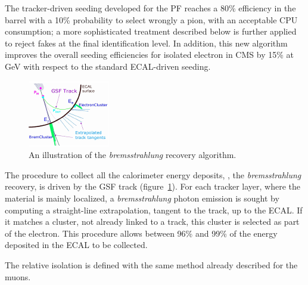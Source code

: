 The tracker-driven seeding developed for the PF reaches a 80\% efficiency in the barrel with a 10\% probability
to select wrongly a pion, with an acceptable CPU consumption; a more sophisticated treatment described below 
is further applied to reject fakes at the final identification level. 
In addition, this new algorithm improves the overall seeding efficiencies for isolated electron in CMS by 15\% at \unit[5]{GeV} with respect to the standard ECAL-driven seeding. 

\begin{figure}[htb]
    \centering
    \includegraphics[width=.5\textwidth]{images/pdf/electron_reconstruction}

    \caption{An illustration of the \emph{bremsstrahlung} recovery
algorithm.}
    \label{fig:electron_reconstruction}
\end{figure}

The procedure to collect all the calorimeter energy deposits, \ie, the \emph{bremsstrahlung} recovery, is
driven by the GSF track (figure~\ref{fig:electron_reconstruction}). For each tracker layer, where 
the material is mainly localized, a \emph{bremsstrahlung} photon emission is sought by computing a straight-line
extrapolation, tangent to the track, up to the ECAL. If it matches a cluster, not already linked
to a track, this cluster is selected as part of the electron. 
This procedure allows between 96\% and 99\% of the energy deposited in the ECAL to be collected.

The relative isolation is defined with the same method already described for
the muons.

